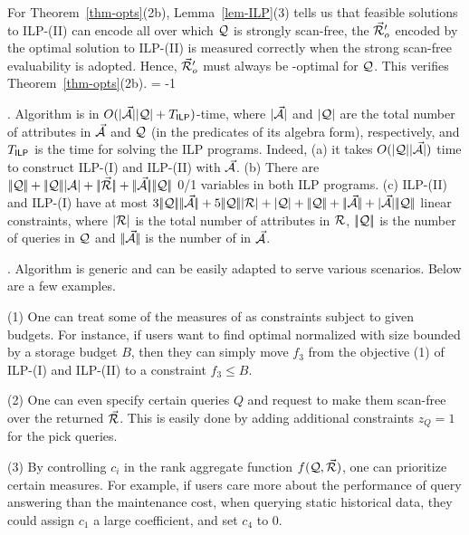 \vspace{0.6ex}
For Theorem~\ref{thm-opts}(2b),
Lemma~\ref{lem-ILP}(3) tells us that feasible solutions to
ILP-(II) can encode all \bdss over which $\mathcal Q$ is strongly
scan-free, \ie the \bds $\vec{{\mathcal R}}_{o}'$ encoded by the optimal
solution to ILP-(II) is measured correctly
when the strong scan-free evaluability is
adopted. Hence, $\vec{{\mathcal R}}_{o}'$ must always be \ssf-optimal for
$\mathcal Q$. This verifies Theorem~\ref{thm-opts}(2b). \eop
\looseness = -1


. Algorithm \opts is in
$O(|{\vec{{\mathcal A}}}||{\mathcal Q}| + T_{\protect\mathsf{ILP}} )$-time, where
$|{\vec{{\mathcal A}}}|$ and $|{\mathcal Q}|$ are the total number of attributes
in $\vec{{\mathcal A}}$ and $\mathcal Q$ (in the predicates of its algebra form),
respectively, and $T_{\protect\mathsf{ILP}}$ is the time for solving the ILP programs. 
Indeed, %
(a) it takes $O(|{\mathcal Q}||{\vec{{\mathcal A}}}|)$ time to construct ILP-(I) and
ILP-(II) with $\vec{{\mathcal A}}$.
(b) There are $\cdd{\Q} + \cdd{\Q}\cd{\A} + \cdd{\kb{\R}} + \cdd{\kb{\A}}\cdd{\Q}$ 0/1
variables in both ILP programs.
(c) ILP-(II) and ILP-(I) have at most
$3\cdd{\Q}\cdd{\kb{\A}} + 5\cdd{\Q}\cd{\R} + \cd{\Q} +
\cdd{\Q} + \cdd{\kb{\A}} + \cd{\kb{\A}}\cdd{\Q}$ linear
constraints, where $|{{\mathcal R}}|$ is the total number of attributes in
${\mathcal R}$, $|\!|{\mathcal Q}|\!|$ is the number of queries in $\mathcal Q$ and
$|\!|{\vec{{\mathcal A}}}|\!|$ is the number of \bss in $\vec{{\mathcal A}}$. 



. Algorithm \opts is generic and can be easily
adapted to serve various scenarios. Below are a few examples.

\sstab (1) One can treat some of the measures of \opts
as constraints subject to given budgets. For instance, if users
want to find optimal normalized \bds with size bounded by a
storage budget $B$, then they can simply move $f_{3}$ from the
objective (1) of ILP-(I) and ILP-(II) to a constraint 
$f_{3}\leq B$.

\sstab (2) One can even specify certain queries $Q$ and request
to make them scan-free over the returned \bds $\vec{{\mathcal R}}$. This is
easily done by adding additional constraints $z_{Q} = 1$
for the pick queries.

\sstab (3) By controlling $c_{i}$ in the rank aggregate function
$f(\mathcal Q, \vec{{\mathcal R}})$, one can prioritize certain
measures. For example, if users care more about the
  performance of query answering than
the maintenance cost, \eg when querying static historical data,
they could assign $c_{1}$ a
  large coefficient, %
  and set $c_{4}$
to 0.


